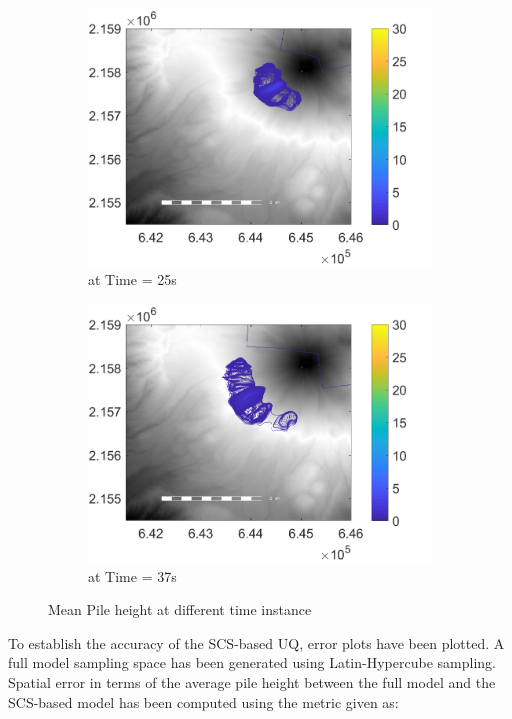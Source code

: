 \begin{figure}[H]
\begin{subfigure}{0.46\textwidth}
\includegraphics[width=\textwidth]{dem_figs/newres_25}
\caption{at Time = 25s}
\end{subfigure}
\begin{subfigure}{0.46\textwidth}
\centering
\includegraphics[width=\textwidth]{dem_figs/newres_37}
\caption{at Time = 37s}
\end{subfigure}
\caption{Mean Pile height at different time instance}
\label{fig:colima_simulate}
\end{figure}

To establish the accuracy of the SCS-based UQ, error plots have been plotted. A full model sampling space has been generated using Latin-Hypercube sampling. Spatial error in terms of the average pile height between the full model and the SCS-based model has been computed using the metric given as:


